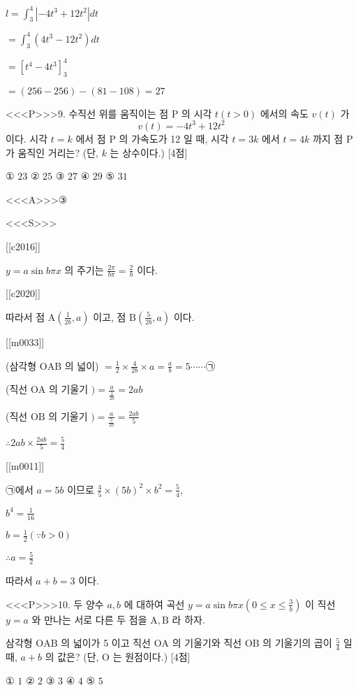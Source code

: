 \documentclass{oblivoir}
\begin{document}
$l =\int_{3}^{4}\left|-4 t^{3}+12 t^{2}\right| d t$

$=\int_{3}^{4}\left(4 t^{3}-12 t^{2}\right) d t$

$=\left[t^{4}-4 t^{3}\right]_{3}^{4}$

$=(256-256)-(81-108)=27$


<<<P>>>9. 수직선 위를 움직이는 점 $\mathrm{P}$ 의 시각 $t(t>0)$ 에서의 속도 $v(t)$ 가
$$
v(t)=-4 t^{3}+12 t^{2}
$$
이다. 시각 $t=k$ 에서 점 $\mathrm{P}$ 의 가속도가 12 일 때, 시각 $t=3 k$ 에서 $t=4 k$ 까지 점 $\mathrm{P}$ 가 움직인 거리는? (단, $k$ 는 상수이다.) [4점]

① $23$
② $25$
③ $27$
④ $29$
⑤ $31$

<<<A>>>③

<<<S>>>

[[c2016]]

$y=a \sin b \pi x$ 의 주기는 $\frac{2 \pi}{b \pi}=\frac{2}{b}$ 이다.

[[c2020]]

따라서 점 $\mathrm{A}\left(\frac{1}{2 b}, a\right)$ 이고, 점 $\mathrm{B}\left(\frac{5}{2 b}, a\right)$ 이다.

[[m0033]]

(삼각형 $\mathrm{OAB}$ 의 넓이) $=\frac{1}{2} \times \frac{4}{2 b} \times a=\frac{a}{b}=5\cdots\cdots$㉠

(직선 $\mathrm{OA}$ 의 기울기 $)=\frac{a}{\frac{1}{2 b}}=2 a b$

(직선 $\mathrm{OB}$ 의 기울기 $)=\frac{a}{\frac{5}{2 b}}=\frac{2 a b}{5}$

$\therefore 2 a b \times \frac{2 a b}{5}=\frac{5}{4}$

[[m0011]]

㉠에서 $a=5 b$ 이므로 $\frac{4}{5} \times(5 b)^{2} \times b^{2}=\frac{5}{4}$,

$b^{4}=\frac{1}{16}$

$b=\frac{1}{2}(\because b>0)$

$\therefore a=\frac{5}{2}$

따라서 $a+b=3$ 이다.


<<<P>>>10. 두 양수 $a, b$ 에 대하여 곡선 $y=a \sin b \pi x\left(0 \leq x \leq \frac{3}{b}\right)$ 이 직선 $y=a$ 와 만나는 서로 다른 두 점을 $\mathrm{A}, \mathrm{B}$ 라 하자.

삼각형 $\mathrm{OAB}$ 의 넓이가 5 이고 직선 $\mathrm{OA}$ 의 기울기와 직선 $\mathrm{OB}$ 의 기울기의 곱이 $\frac{5}{4}$ 일 때, $a+b$ 의 값은? (단, $\mathrm{O}$ 는 원점이다.) [4점]

① $1$
② $2$
③ $3$
④ $4$
⑤ $5$
\end{document}
